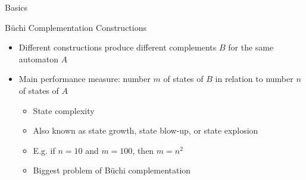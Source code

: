 \documentclass[12pt,handout]{beamer}
\begin{document}
\begin{frame}{Basics}
\end{frame}

\begin{frame}{Büchi Complementation Constructions}
\centering
{}
\begin{itemize}
\item Different constructions produce different complements $B$ for the same automaton $A$
\item Main performance measure: number $m$ of states of $B$ in relation to number $n$ of states of $A$
  \begin{itemize}
  \item State complexity
  \item Also known as state growth, state blow-up, or state explosion
  \item E.g. if $n=10$ and $m=100$, then $m=n^2$
  \item Biggest problem of Büchi complementation
  \end{itemize}
\end{itemize}
\end{frame}
\end{document}

